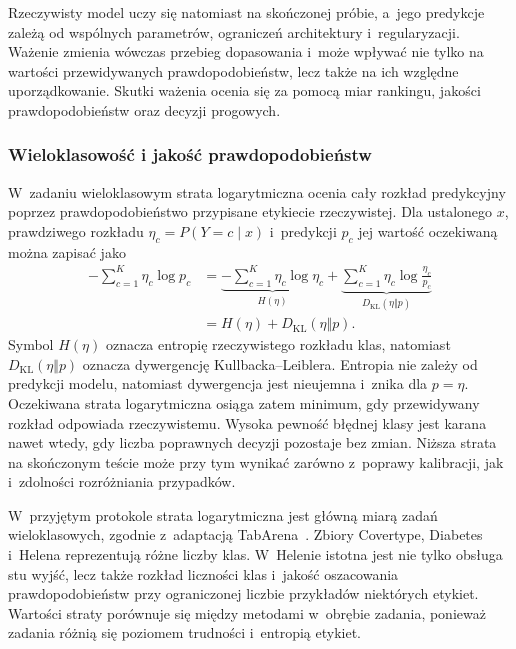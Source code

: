 Rzeczywisty model uczy się natomiast na skończonej próbie, a~jego predykcje zależą od wspólnych parametrów, ograniczeń architektury i~regularyzacji. Ważenie zmienia wówczas przebieg dopasowania i~może wpływać nie tylko na wartości przewidywanych prawdopodobieństw, lecz także na ich względne uporządkowanie. Skutki ważenia ocenia się za pomocą miar rankingu, jakości prawdopodobieństw oraz decyzji progowych.

\subsubsection{Wieloklasowość i jakość prawdopodobieństw}

W~zadaniu wieloklasowym strata logarytmiczna ocenia cały rozkład predykcyjny poprzez prawdopodobieństwo przypisane etykiecie rzeczywistej. Dla ustalonego $x$, prawdziwego rozkładu $\eta_c=P(Y=c\mid x)$ i~predykcji $p_c$ jej wartość oczekiwaną można zapisać jako
\begin{equation}
\begin{aligned}
-\sum_{c=1}^{K}\eta_c\log p_c
&=\underbrace{-\sum_{c=1}^{K}\eta_c\log\eta_c}_{H(\eta)}
+\underbrace{\sum_{c=1}^{K}\eta_c\log\frac{\eta_c}{p_c}}_{D_{\mathrm{KL}}(\eta\Vert p)}\\
&=H(\eta)+D_{\mathrm{KL}}(\eta\Vert p).
\end{aligned}
\label{eq:logloss-kl}
\end{equation}
Symbol $H(\eta)$ oznacza entropię rzeczywistego rozkładu klas, natomiast $D_{\mathrm{KL}}(\eta\Vert p)$ oznacza dywergencję Kullbacka--Leiblera. Entropia nie zależy od predykcji modelu, natomiast dywergencja jest nieujemna i~znika dla $p=\eta$. Oczekiwana strata logarytmiczna osiąga zatem minimum, gdy przewidywany rozkład odpowiada rzeczywistemu. Wysoka pewność błędnej klasy jest karana nawet wtedy, gdy liczba poprawnych decyzji pozostaje bez zmian. Niższa strata na skończonym teście może przy tym wynikać zarówno z~poprawy kalibracji, jak i~zdolności rozróżniania przypadków.

W~przyjętym protokole strata logarytmiczna jest główną miarą zadań wieloklasowych, zgodnie z~adaptacją TabArena~\cite{erickson2025tabarena}. Zbiory Covertype, Diabetes i~Helena reprezentują różne liczby klas. W~Helenie istotna jest nie tylko obsługa stu wyjść, lecz także rozkład liczności klas i~jakość oszacowania prawdopodobieństw przy ograniczonej liczbie przykładów niektórych etykiet. Wartości straty porównuje się między metodami w~obrębie zadania, ponieważ zadania różnią się poziomem trudności i~entropią etykiet.

